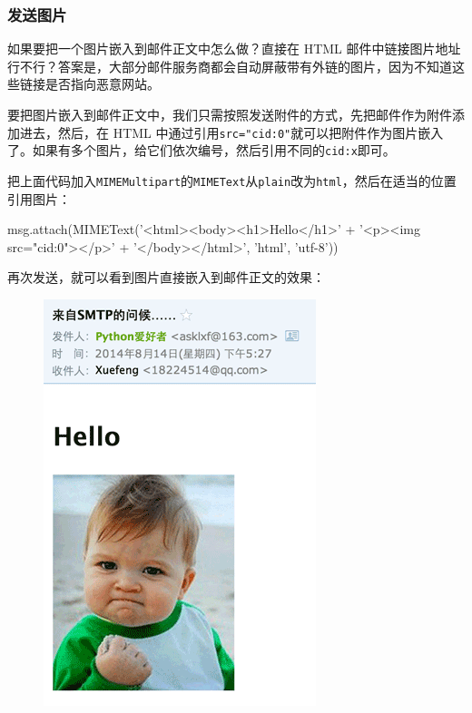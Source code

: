 \hypertarget{ux53d1ux9001ux56feux7247}{%
\subsubsection{发送图片}\label{ux53d1ux9001ux56feux7247}}

如果要把一个图片嵌入到邮件正文中怎么做？直接在 HTML
邮件中链接图片地址行不行？答案是，大部分邮件服务商都会自动屏蔽带有外链的图片，因为不知道这些链接是否指向恶意网站。

要把图片嵌入到邮件正文中，我们只需按照发送附件的方式，先把邮件作为附件添加进去，然后，在
HTML
中通过引用\texttt{src="cid:0"}就可以把附件作为图片嵌入了。如果有多个图片，给它们依次编号，然后引用不同的\texttt{cid:x}即可。

把上面代码加入\texttt{MIMEMultipart}的\texttt{MIMEText}从\texttt{plain}改为\texttt{html}，然后在适当的位置引用图片：

\begin{pythoncode}
msg.attach(MIMEText('<html><body><h1>Hello</h1>' +
    '<p><img src="cid:0"></p>' +
    '</body></html>', 'html', 'utf-8'))
\end{pythoncode}

再次发送，就可以看到图片直接嵌入到邮件正文的效果：

 
 \begin{figure}[htp]
	\centering
	\includegraphics[width=0.6\linewidth]{fig/967488004941504.png}
\end{figure}


